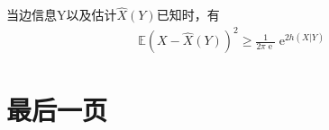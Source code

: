 \documentclass{ctexbook}
\DeclareMathOperator{\e}{e}
\begin{document}
\begin{corollary}
    当边信息Y以及估计$\hat{X}(Y)$已知时，有\begin{align*}
        \mathbb{E} (X-\hat{X}(Y))^2\geq \frac{1}{2\pi \e}\e^{2h(X|Y)}
    \end{align*}
\end{corollary}

\chapter{最后一页}
\end{document}
